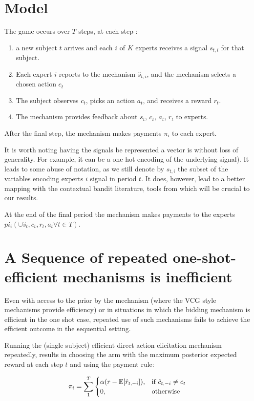 \section{Model}

The game occurs over $T$ steps, at each step : 
\begin{enumerate}
\item a new subject $t$ arrives and each $i$ of $K$ experts receives a signal $s_{t,i}$ for that subject.
\item Each expert $i$ reports to the mechanism $\hat{s}_{t,i}$, and the mechanism selects a chosen action $c_t$
\item The subject observes $c_t$, picks an action $a_t$, and receives a reward $r_t$.
\item The mechanism provides feedback about $s_t$, $c_t$, $a_t$, $r_t$ to experts.
\end{enumerate}
After the final step, the mechanism makes payments $\pi_i$ to each expert.


It is worth noting having the signals be represented a vector is without loss of generality. For example, it can be a one hot encoding of the underlying signal). It leads to some abuse of notation, as we still denote by $s_{t,i}$ the subset of the variables encoding experts $i$ signal in period $t$. It does, however, lead to a better mapping with the contextual bandit literature, tools from which will be crucial to our results. 

At the end of the final period the mechanism makes payments to the experts $pi_i( \cup \hat{s}_t,c_t,r_t,a_t \forall t \in T)$.

\section{A Sequence of repeated one-shot-efficient mechanisms is inefficient}


Even with access to the prior by the mechanism (where the VCG style mechanisms provide efficiency) or in situations in which the bidding mechanism is efficient in the one shot case, repeated use of such mechanisms fails to achieve the efficient outcome in the sequential setting. 

Running the (single subject) efficient direct action elicitation mechanism repeatedly, results in choosing the arm with the maximum posterior expected reward at each step $t$ and using the payment rule:

\[
    \pi_i = \sum_1^T 
\begin{cases}
    \alpha (r - \expec[\hat{r}_{t,-i}]) ,& \text{if } \hat{c}_{t,-i} \neq c_t\\
    0,              & \text{otherwise}
\end{cases}
\]


